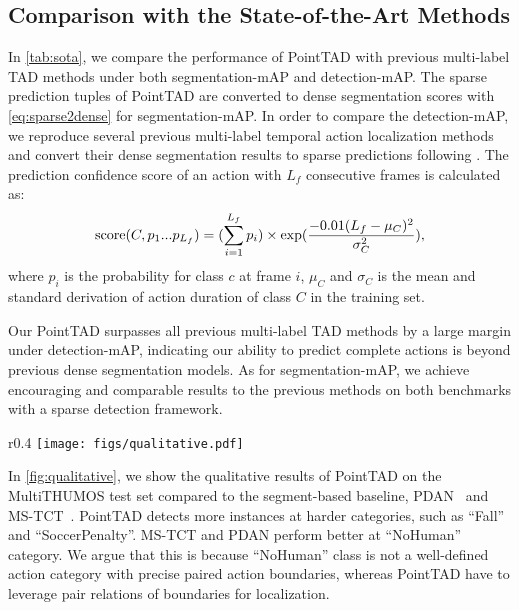 \documentclass{article}
\begin{document}
\subsection{Comparison with the State-of-the-Art Methods}

In \cref{tab:sota}, we compare the performance of PointTAD with previous multi-label TAD methods under both segmentation-mAP and detection-mAP. The sparse prediction tuples of PointTAD are converted to dense segmentation scores with \cref{eq:sparse2dense} for segmentation-mAP. In order to compare the detection-mAP, we reproduce several previous multi-label temporal action localization methods and convert their dense segmentation results to sparse predictions following \cite{DBLP:journals/ijcv/YeungRJAMF18}. 
The prediction confidence score of an action with $L_f$ consecutive frames is calculated as: 
\begin{align}
    {\rm score}(C, p_1 ... p_{L_f}) = (\sum^{L_f}_{i=1} p_i) \times \exp(\frac{-0.01(L_f-\mu_C)^2}{\sigma_C^2}),
    \label{eq:dense2sparse}
\end{align}
where $p_i$ is the probability for class $c$ at frame $i$, $\mu_C$ and $\sigma_C$ is the mean and standard derivation of action duration of class $C$ in the training set.

Our PointTAD surpasses all previous multi-label TAD methods by a large margin under detection-mAP, indicating our ability to predict complete actions is beyond previous dense segmentation models. As for segmentation-mAP, we achieve encouraging and comparable results to the previous methods on both benchmarks with a sparse detection framework.\\
\begin{wrapfigure}{r}{0.4\textwidth}
    \centering
        \vspace{-8mm}
         \texttt{[image: figs/qualitative.pdf]}
         \vspace{-4mm}
         \caption{\small{\bf Qualitative results} on the MultiTHUMOS test set.}
         \label{fig:qualitative}
        \vspace{-8mm}
\end{wrapfigure}
In \cref{fig:qualitative}, we show the qualitative results of PointTAD on the MultiTHUMOS test set compared to the segment-based baseline, PDAN~\cite{DBLP:conf/wacv/DaiDMGFB21} and MS-TCT~\cite{DBLP:conf/cvpr/DaiDKRB22}. {PointTAD detects more instances at harder categories, such as ``Fall'' and ``SoccerPenalty''.}  MS-TCT and PDAN perform better at ``NoHuman'' category. We argue that this is because ``NoHuman'' class is not a well-defined action category with precise paired action boundaries, whereas PointTAD have to leverage pair relations of boundaries for localization. 
\end{document}
